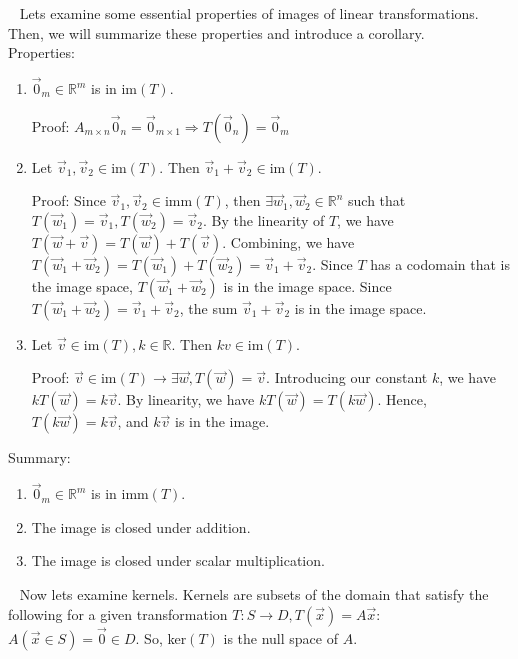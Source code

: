 \documentclass[11pt]{article}
\begin{document}
$\,\,\,$ Lets examine some essential properties of images of linear transformations. Then, we will summarize these properties and introduce a corollary.\\

Properties:
\begin{enumerate}
\item $\vec{0}_m\in\mathbb{R}^m$ is in im$(T)$.

Proof: $A_{m\times n}\vec{0}_n=\vec{0}_{m\times 1}\Rightarrow T(\vec{0}_n)=\vec{0}_m$
\item Let $\vec{v}_1,\vec{v}_2\in\text{im}(T)$. Then $\vec{v}_1+\vec{v}_2\in\text{im}(T)$.

Proof: Since $\vec{v}_1,\vec{v}_2\in\text{imm}(T)$, then $\exists \vec{w}_1,\vec{w}_2\in\mathbb{R}^n$ such that $T(\vec{w}_1)=\vec{v}_1,T(\vec{w}_2)=\vec{v}_2$. By the linearity of $T$, we have $T(\vec{w}+\vec{v})=T(\vec{w})+T(\vec{v})$. Combining, we have $T(\vec{w}_1+\vec{w}_2)=T(\vec{w}_1)+T(\vec{w}_2)=\vec{v}_1+\vec{v}_2$. Since $T$ has a codomain that is the image space, $T(\vec{w}_1+\vec{w}_2)$ is in the image space. Since $T(\vec{w}_1+\vec{w}_2)=\vec{v}_1+\vec{v}_2$, the sum $\vec{v}_1+\vec{v}_2$ is in the image space.
\item Let $\vec{v}\in \text{im}(T), k\in\mathbb{R}$. Then $kv\in\text{im}(T)$.

Proof: $\vec{v}\in\text{im}(T)\rightarrow\exists\vec{w},T(\vec{w})=\vec{v}$. Introducing our constant $k$, we have $kT(\vec{w})=k\vec{v}$. By linearity, we have $kT(\vec{w})=T(k\vec{w})$. Hence, $T(k\vec{w})=k\vec{v}$, and $k\vec{v}$ is in the image.\\
\end{enumerate}

Summary:
\begin{enumerate}
\item $\vec{0}_m\in\mathbb{R}^m$ is in $\text{imm}(T)$.
\item The image is closed under addition.
\item The image is closed under scalar multiplication.\\
\end{enumerate}

$\,\,\,$ Now lets examine kernels. Kernels are subsets of the domain that satisfy the following for a given transformation $T:S\rightarrow D,T(\vec{x})=A\vec{x}$: $A(\vec{x}\in S)=\vec{0}\in D$. So, ker$(T)$ is the null space of $A$.
\end{document}
